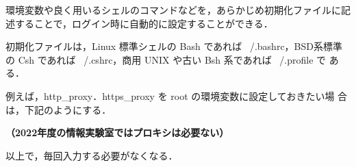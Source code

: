 環境変数や良く用いるシェルのコマンドなどを，あらかじめ初期化ファイルに記
述することで，ログイン時に自動的に設定することができる．

初期化ファイルは，Linux 標準シェルの Bash であれば ~/.bashrc，BSD系標準
の Csh であれば ~/.cshrc，商用 UNIX や古い Bsh 系であれば ~/.profile で
ある．

例えば，http\_proxy．https\_proxy を root の環境変数に設定しておきたい場
合は，下記のようにする．

\textbf{（2022年度の情報実験室ではプロキシは必要ない）}


以上で，毎回入力する必要がなくなる．
